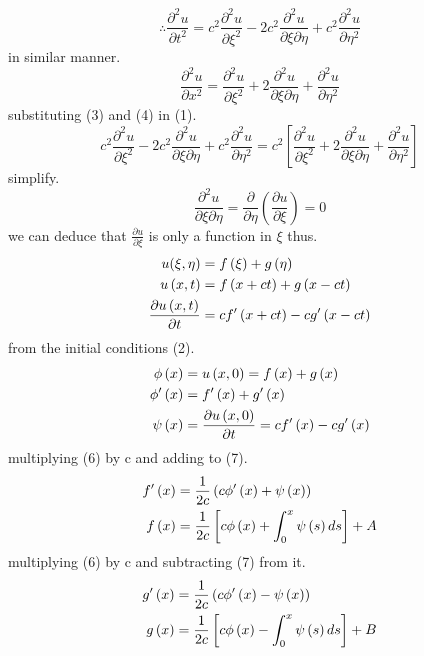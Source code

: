 \documentclass[]{article}
\begin{document}
\begin{equation}
\therefore \frac{\partial^2 u}{\partial t^2} = c^2\frac{\partial^2 u}{\partial\xi^2}-2c^2\frac{\partial^2 u}{\partial\xi\partial\eta}+c^2\frac{\partial^2 u}{\partial\eta^2}
\end{equation}
in similar manner.
\begin{equation}
\frac{\partial^2 u}{\partial x^2} = \frac{\partial^2 u}{\partial\xi^2}+2\frac{\partial^2 u}{\partial\xi\partial\eta}+\frac{\partial^2 u}{\partial\eta^2}
\end{equation}
substituting (3) and (4) in (1).
\[
c^2\frac{\partial^2 u}{\partial\xi^2}-2c^2\frac{\partial^2 u}{\partial\xi\partial\eta}+c^2\frac{\partial^2 u}{\partial\eta^2} = c^2\left[\frac{\partial^2 u}{\partial\xi^2}+2\frac{\partial^2 u}{\partial\xi\partial\eta}+\frac{\partial^2 u}{\partial\eta^2}\right]    
\]
simplify.
\[
    \frac{\partial^2 u}{\partial\xi\partial\eta} = \frac{\partial}{\partial\eta}\left(\frac{\partial u}{\partial\xi}\right)= 0    
\]
we can deduce that $\frac{\partial u}{\partial\xi}$ is only a function in $\xi$ thus.
\begin{align}
u(\xi , \eta) &= f\left(\xi\right)+g\left(\eta \right)\notag
\\
u\left(x,t\right)&=f\left(x+ct\right)+g\left(x-ct\right)
\\
\frac{\partial u\left(x,t\right)}{\partial t} &= cf'\left(x+ct\right)-cg'\left(x-ct\right)\notag
\end{align}
from the initial conditions (2).
\begin{align}
\phi\left(x\right) &= u\left(x,0\right)= f\left(x\right)+g\left(x\right)\notag
\\ 
\phi'\left(x\right) &= f'\left(x\right)+g'\left(x\right)
\\ 
\psi\left(x\right)&=\frac{\partial u\left(x,0\right)}{\partial t} = cf'\left(x\right)-cg'\left(x\right)
\end{align}
multiplying (6) by c and adding to (7).
\begin{align}
f'\left(x\right) &= \frac{1}{2c}\left(c\phi'\left(x\right)+\psi\left(x\right)\right)\notag
\\ 
f\left(x\right) &= \frac{1}{2c}\left[c\phi\left(x\right)+\int_0^x \psi\left(s\right)ds\right]+A
\end{align}
multiplying (6) by c and subtracting (7) from it.
\begin{align}
g'\left(x\right) &= \frac{1}{2c}\left(c\phi'\left(x\right)-\psi\left(x\right)\right)\notag
\\ 
g\left(x\right) &= \frac{1}{2c}\left[c\phi\left(x\right)-\int_0^x \psi\left(s\right)ds\right]+B
\end{align}
\end{document}

